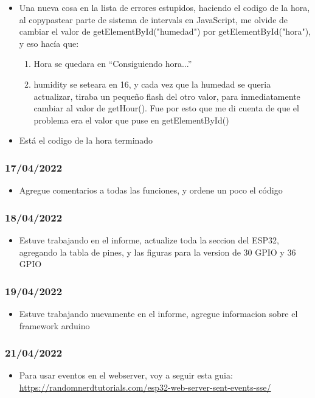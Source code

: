\documentclass[../informe_krapp.tex]{subfiles}
\begin{document}
\begin{itemize}
	\item Una nueva cosa en la lista de errores estupidos, haciendo el codigo de la hora,
	      al copypastear parte de sistema de intervals en JavaScript, me olvide de cambiar el valor de getElementById("humedad") por getElementById("hora"), y eso
	      hacía que:
	      \begin{enumerate}
		      \item Hora se quedara en ``Consiguiendo hora...''
		      \item humidity se seteara en 16, y cada vez que la humedad se queria actualizar,
		            tiraba un pequeño flash del otro valor, para inmediatamente cambiar
		            al valor de getHour(). Fue por esto que me di cuenta de que el
		            problema era el valor que puse en getElementById()
	      \end{enumerate}
	\item Está el codigo de la hora terminado
\end{itemize}

\subsubsection*{17/04/2022}
\begin{itemize}
	\item Agregue comentarios a todas las funciones, y ordene un poco el código
\end{itemize}

\subsubsection*{18/04/2022}
\begin{itemize}
	\item Estuve trabajando en el informe, actualize toda la seccion del ESP32, agregando
	      la tabla de pines, y las figuras para la version de 30 GPIO y 36 GPIO
\end{itemize}

\subsubsection*{19/04/2022}
\begin{itemize}
	\item Estuve trabajando nuevamente en el informe, agregue informacion sobre el framework
	      arduino
\end{itemize}

\subsubsection*{21/04/2022}
\begin{itemize}
	\item Para usar eventos en el webserver, voy a seguir esta guia:
	      \url{https://randomnerdtutorials.com/esp32-web-server-sent-events-sse/}
\end{itemize}
\end{document}

